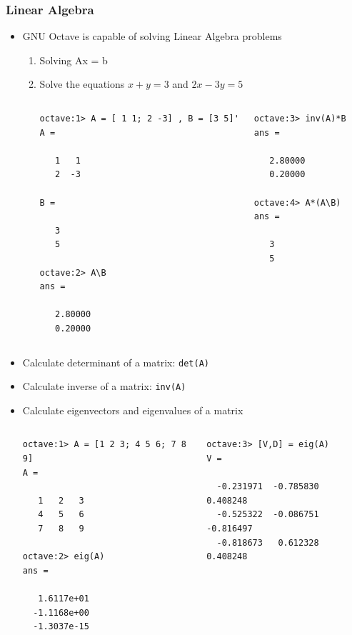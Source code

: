 \documentclass[t,compress,xcolor=svgnames]{beamer}
\begin{document}
\begin{frame}
  \frametitle{\small Linear Algebra}
  \begin{itemize}
    \item GNU Octave is capable of solving Linear Algebra problems
    \begin{enumerate}
      \item Solving Ax = b
      \item[] Solve the equations $x+y=3$ and $2x-3y=5$
      {\tiny
        \begin{columns}
          \column{4cm}
          \begin{verbatim}
octave:1> A = [ 1 1; 2 -3] , B = [3 5]'
A =

   1   1
   2  -3

B =

   3
   5

octave:2> A\B
ans =

   2.80000
   0.20000
          \end{verbatim}
          \column{4cm}
          \begin{verbatim}
octave:3> inv(A)*B
ans =

   2.80000
   0.20000

octave:4> A*(A\B)
ans =

   3
   5
          \end{verbatim}
        \end{columns}
      }
    \end{enumerate}
    \item Calculate determinant of a matrix: \texttt{det(A)}
    \item Calculate inverse of a matrix: \texttt{inv(A)}
    \framebreak
    \item Calculate eigenvectors and eigenvalues of a matrix
    {\tiny
      \begin{columns}
        \column{4cm}
        \begin{verbatim}
octave:1> A = [1 2 3; 4 5 6; 7 8 9]
A =

   1   2   3
   4   5   6
   7   8   9

octave:2> eig(A)
ans =

   1.6117e+01
  -1.1168e+00
  -1.3037e-15
        \end{verbatim}
        \column{4cm}
        \begin{verbatim}
octave:3> [V,D] = eig(A)
V =

  -0.231971  -0.785830   0.408248
  -0.525322  -0.086751  -0.816497
  -0.818673   0.612328   0.408248


\end{verbatim}
\end{columns}}
\end{itemize}
\end{frame}
\end{document}
